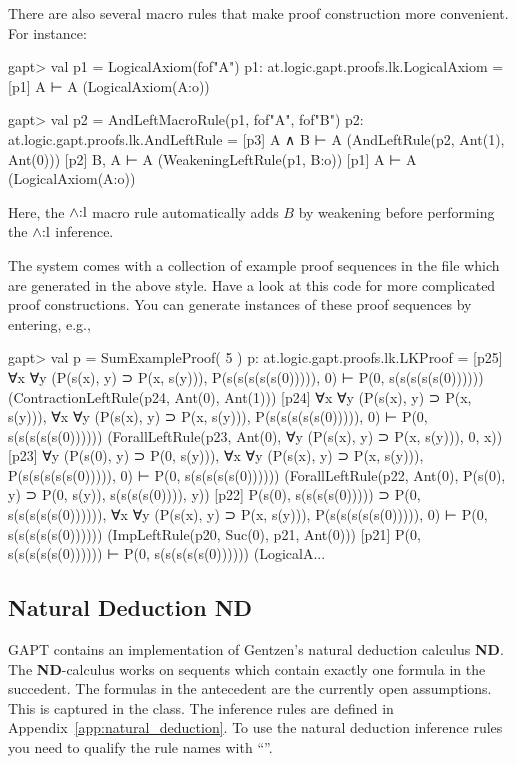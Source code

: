 \documentclass[a4paper,11pt]{book}
\renewcommand{\land}{\wedge}
\newcommand{\ND}{\textbf{ND}}
\newcommand{\mt}[1]{\textnormal{#1}}
\newcommand{\cli}[1]{{\ttfamily {#1}}}
\begin{document}
There are also several macro rules that make proof construction more convenient.
For instance:
\begin{clilisting}
gapt> val p1 = LogicalAxiom(fof"A")
p1: at.logic.gapt.proofs.lk.LogicalAxiom =
[p1] A ⊢ A    (LogicalAxiom(A:o))

gapt> val p2 = AndLeftMacroRule(p1, fof"A", fof"B")
p2: at.logic.gapt.proofs.lk.AndLeftRule =
[p3] A ∧ B ⊢ A    (AndLeftRule(p2, Ant(1), Ant(0)))
[p2] B, A ⊢ A    (WeakeningLeftRule(p1, B:o))
[p1] A ⊢ A    (LogicalAxiom(A:o))

\end{clilisting}
Here, the $\land\mt{:l}$ macro rule automatically adds $B$ by weakening before
performing the $\land\mt{:l}$ inference.

The system comes with a collection of example proof sequences in the file
\cli{examples/ProofSequences.scala} which are generated in the above style.
Have a look at this code for more complicated proof constructions.
You can generate instances of these proof sequences by entering, e.g.,
\begin{clilisting}
gapt> val p = SumExampleProof( 5 )
p: at.logic.gapt.proofs.lk.LKProof =
[p25] ∀x ∀y (P(s(x), y) ⊃ P(x, s(y))), P(s(s(s(s(s(0))))), 0) ⊢ P(0, s(s(s(s(s(0))))))    (ContractionLeftRule(p24, Ant(0), Ant(1)))
[p24] ∀x ∀y (P(s(x), y) ⊃ P(x, s(y))),
∀x ∀y (P(s(x), y) ⊃ P(x, s(y))),
P(s(s(s(s(s(0))))), 0)
⊢
P(0, s(s(s(s(s(0))))))    (ForallLeftRule(p23, Ant(0), ∀y (P(s(x), y) ⊃ P(x, s(y))), 0, x))
[p23] ∀y (P(s(0), y) ⊃ P(0, s(y))),
∀x ∀y (P(s(x), y) ⊃ P(x, s(y))),
P(s(s(s(s(s(0))))), 0)
⊢
P(0, s(s(s(s(s(0))))))    (ForallLeftRule(p22, Ant(0), P(s(0), y) ⊃ P(0, s(y)), s(s(s(s(0)))), y))
[p22] P(s(0), s(s(s(s(0))))) ⊃ P(0, s(s(s(s(s(0)))))),
∀x ∀y (P(s(x), y) ⊃ P(x, s(y))),
P(s(s(s(s(s(0))))), 0)
⊢
P(0, s(s(s(s(s(0))))))    (ImpLeftRule(p20, Suc(0), p21, Ant(0)))
[p21] P(0, s(s(s(s(s(0)))))) ⊢ P(0, s(s(s(s(s(0))))))    (LogicalA...

\end{clilisting}

\subsection{Natural Deduction ND}

GAPT contains an implementation of Gentzen's natural deduction calculus {\ND}.
The {\ND}-calculus works on sequents which contain exactly one formula in the succedent.
The formulas in the antecedent are the currently open assumptions. This is captured
in the \cli{NDSequent} class. The inference rules are defined in Appendix~\ref{app:natural_deduction}.
To use the natural deduction inference rules you need to qualify the rule names with ``\cli{nd.}''.
\end{document}
